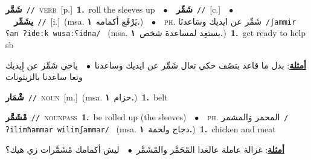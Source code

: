 \documentclass[10pt,a4paper,twoside]{article} %
\begin{document}
\begin{multicols}{2}
{\setlength\topsep{0pt}\textbf{\foreignlanguage{arabic}{شَمَّر}}\ {\color{gray}\texttt{//}\color{black}}\ \textsc{verb}\ [p.]\ \textbf{1.}~roll the sleeves up\ \ $\bullet$\ \ \setlength\topsep{0pt}\textbf{\foreignlanguage{arabic}{شَمِّر}}\ {\color{gray}\texttt{//}\color{black}}\ [c.]\ \ $\bullet$\ \ \setlength\topsep{0pt}\textbf{\foreignlanguage{arabic}{يشَمِّر}}\ {\color{gray}\texttt{//}\color{black}}\ [i.]\ \color{gray}(msa. \foreignlanguage{arabic}{يَرْفَع أكمامه}~\foreignlanguage{arabic}{\textbf{١.}})\color{black}\ \ $\bullet$\ \ \textsc{ph.} \color{gray} \foreignlanguage{arabic}{شَمِّر عن ايديك وسَاعدنَا}\color{black}\ {\color{gray}\texttt{/{\sffamily ʃammir ʕan ʔideːk wusaːʕidna}/}\color{black}}\ \color{gray} (msa. \foreignlanguage{arabic}{يستعِد لمساعدة شخص}~\foreignlanguage{arabic}{\textbf{١.}})\color{black}\ \textbf{1.}~get ready to help sb\  \begin{flushright}\color{gray}\foreignlanguage{arabic}{\textbf{\underline{\foreignlanguage{arabic}{أمثلة}}}: بدل ما قاعد بتصُف حكي تعال شَمِّر عن ايديك وساعدنا\ $\bullet$\ \  ياخي شَمِّر عن إِيديك وتعا ساعدنا بالزيتونات}\end{flushright}\color{black}} \vspace{2mm}

{\setlength\topsep{0pt}\textbf{\foreignlanguage{arabic}{شْمَار}}\ {\color{gray}\texttt{//}\color{black}}\ \textsc{noun}\ [m.]\ \color{gray}(msa. \foreignlanguage{arabic}{حزام}~\foreignlanguage{arabic}{\textbf{١.}})\color{black}\ \textbf{1.}~belt\ } \vspace{2mm}

{\setlength\topsep{0pt}\textbf{\foreignlanguage{arabic}{مْشَمَّر}}\ {\color{gray}\texttt{//}\color{black}}\ \textsc{noun\textunderscore pass}\ \textbf{1.}~be rolled up (the sleeves)\ \ $\bullet$\ \ \textsc{ph.} \color{gray} \foreignlanguage{arabic}{المحمر وَالمشمر}\color{black}\ {\color{gray}\texttt{/{\sffamily ʔilimħammar wilimʃammar}/}\color{black}}\ \color{gray} (msa. \foreignlanguage{arabic}{دجاج ولحمة}~\foreignlanguage{arabic}{\textbf{١.}})\color{black}\ \textbf{1.}~chicken and meat\  \begin{flushright}\color{gray}\foreignlanguage{arabic}{\textbf{\underline{\foreignlanguage{arabic}{أمثلة}}}: غزالة عاملة عالغدا المْحَمَّر والمْشَمَّر\ $\bullet$\ \  ليش أكمامك مْشَمَّرات زي هيك؟}\end{flushright}\color{black}} \vspace{2mm}


\end{multicols}
\end{document}
